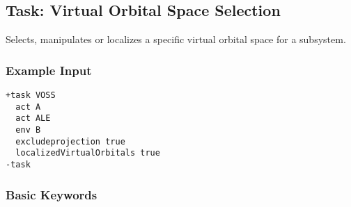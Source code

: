 \subsection{Task: Virtual Orbital Space Selection}
\label{sec:VOSS}
Selects, manipulates or localizes a specific virtual orbital space for a subsystem.
\subsubsection{Example Input}
\begin{lstlisting}
+task VOSS
  act A
  act ALE
  env B
  excludeprojection true
  localizedVirtualOrbitals true
-task
\end{lstlisting}
\subsubsection{Basic Keywords}

